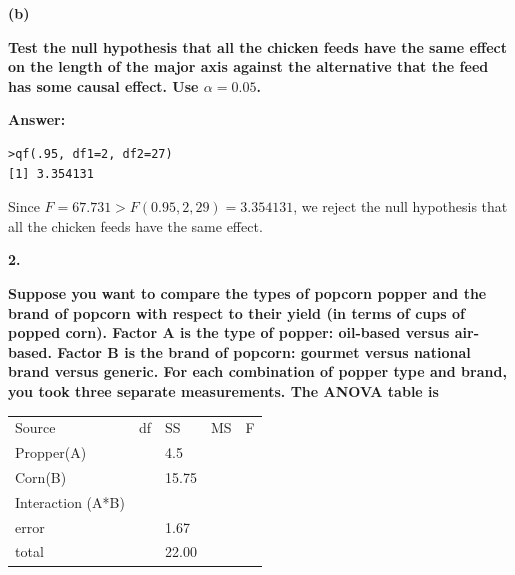 \documentclass[letterpaper,11pt]{article}
\begin{document}
\begin{addmargin}[-1.1em]{0em}
\textbf{(b)}\par\end{addmargin}
  \textbf{Test the null hypothesis that all the chicken feeds have the same effect on the length of the major axis against the alternative that the feed has some causal effect. Use $\alpha = 0.05$.
}\par
\bigbreak

\begin{addmargin}[-0.5em]{0em}
\textbf{Answer: }\end{addmargin}

\begin{lstlisting}
>qf(.95, df1=2, df2=27)
[1] 3.354131
\end{lstlisting}

Since $F = 67.731 > F(0.95, 2, 29) = 3.354131$, we reject the null hypothesis that all the chicken feeds have the same effect.





  \begin{addmargin}[-2em]{0em} \large{\textbf{2. }}\end{addmargin}

  \begin{addmargin}[-1.1em]{0em} \textbf{Suppose you want to compare the types of popcorn popper and the brand of popcorn with respect to their yield (in terms of cups of popped corn). Factor A is the type of popper: oil-based versus air-based. Factor B is the brand of popcorn: gourmet versus national brand versus generic. For each combination of popper type and brand, you took three separate measurements. The ANOVA table is}\par\end{addmargin}

    \begin{center}
    \begin{tabular}{ p{5cm}p{1cm}p{1cm}p{1cm}p{1cm}}
    \centering Source & df & SS & MS & F\\
    \centering Propper(A) & {} & 4.5 & {} &\\
    \centering Corn(B) & {} & 15.75 & {} & {}\\
    \centering Interaction (A*B) & {} & {} & {} & {}\\
    \centering error & {} & 1.67 & {} & {}\\
    \centering total & {} & 22.00 & {} & {}\\
    \end{tabular}
    \end{center}
\end{document}
